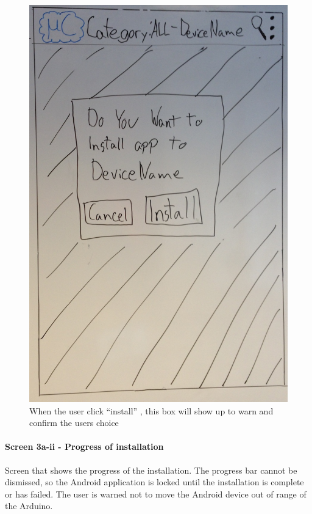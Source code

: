 \begin{figure}[H]
\centering
\includegraphics[scale=0.2]{images/Design_guide/Screen3a-i.png}
\caption[Screen 3a-i - Installation confirmation]{When the user click ``install'' , this box will show up to warn and confirm the users choice}
\label{fig:screen3ai}
\end{figure}


\paragraph{Screen 3a-ii - Progress of installation}
Screen that shows the progress of the installation. The progress bar cannot be dismissed, so the Android application is locked until the installation is complete or has failed.
The user is warned not to move the Android device out of range of the Arduino.


